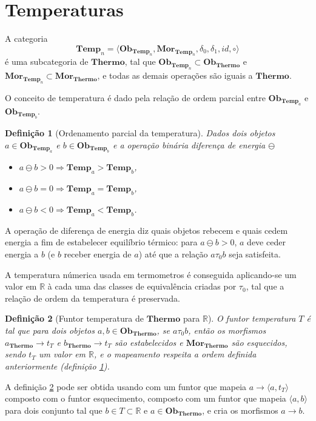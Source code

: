 \documentclass[a4paper]{article}
\newcommand{\trls}{{\tau_0}}
\newcommand{\trl}[2]{{#1 \trls #2}}
\newcommand{\termo}{{\mathbf{Thermo}}}
\newcommand{\obtermo}{{\mathbf{Ob}_\termo}}
\newcommand{\mortermo}{{\mathbf{Mor}_\termo}}
\newcommand{\tempn}[1]{{\mathbf{Temp}_{#1}}}
\newcommand{\temp}{{\tempn{n}}}
\newcommand{\obtempn}[1]{{\mathbf{Ob}_{\tempn{#1}}}}
\newcommand{\mortempn}[1]{{\mathbf{Mor}_{\tempn{#1}}}}
\newcommand{\obtemp}{{\obtempn{n}}}
\newcommand{\mortemp}{{\mortempn{n}}}
\newcommand{\diffen}{{\ominus}}
\newtheorem{definicao}{Definição}[section]
\begin{document}
\section*{Temperaturas}
A categoria
\begin{equation} \label{cat:temp}
\temp = \langle \obtemp, \mortemp, \delta_0, \delta_1, id, \circ\rangle
\end{equation}
é uma subcategoria de $\termo$, tal que $\obtemp \subset \obtermo$ e $\mortemp \subset \mortermo$, e todas as demais operações são iguais a $\termo$.

O conceito de temperatura é dado pela relação de ordem parcial entre $\obtempn{a}$ e $\obtempn{b}$.

\begin{definicao}[Ordenamento parcial da temperatura] \label{def:ordemtemp}
Dados dois objetos $a \in \obtempn{a}$ e $b \in \obtempn{b}$ e a operação binária diferença de energia $\diffen$
\begin{itemize}
\item $a \diffen b > 0 \Rightarrow \tempn{a} > \tempn{b}$,
\item $a \diffen b = 0 \Rightarrow \tempn{a} = \tempn{b}$,
\item $a \diffen b < 0 \Rightarrow \tempn{a} < \tempn{b}$.
\end{itemize}
\end{definicao}

A operação de diferença de energia diz quais objetos rebecem e quais cedem energia a fim de estabelecer equilíbrio térmico: para $a \diffen b > 0$, $a$ deve ceder energia a $b$ (e $b$ receber energia de $a$) até que a relação $\trl{a}{b}$ seja satisfeita.

A temperatura númerica usada em termometros é conseguida aplicando-se um valor em $\mathbb{R}$ à cada uma das classes de equivalência criadas por $\trls$, tal que a relação de ordem da temperatura é preservada.

\begin{definicao}[Funtor temperatura de $\termo$ para $\mathbb{R}$] \label{def:funtemp}
O funtor temperatura $T$ é tal que para dois objetos $a,b \in \obtermo$, se $\trl{a}{b}$, então os morfismos $a_\termo \to t_T$ e $b_\termo \to t_T$ são estabelecidos e $\mortermo$ são esquecidos, sendo $t_T$ um valor em $\mathbb{R}$, e o mapeamento respeita a ordem definida anteriormente (definição \ref{def:ordemtemp}).
\end{definicao}

A definição \ref{def:funtemp} pode ser obtida usando com um funtor que mapeia $a \to \langle a, t_T\rangle$ composto com o funtor esquecimento, composto com um funtor que mapeia $\langle a, b \rangle$ para dois conjunto tal que $b \in T \subset \mathbb{R}$ e $a \in \obtermo$, e cria os morfismos $a \to b$.
\end{document}

